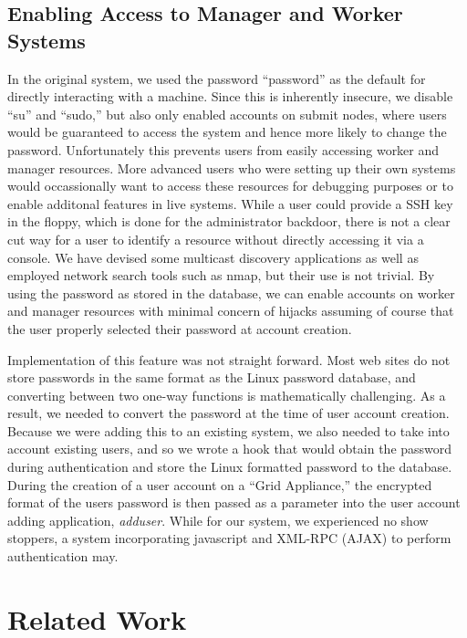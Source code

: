 \documentclass[twocolumn]{svjour3}
\begin{document}
\subsection{Enabling Access to Manager and Worker Systems}
 
In the original system, we used the password ``password'' as the default for
directly interacting with a machine.  Since this is inherently insecure, we
disable ``su'' and ``sudo,'' but also only enabled accounts on submit nodes,
where users would be guaranteed to access the system and hence more likely to
change the password.  Unfortunately this prevents users from easily accessing
worker and manager resources.  More advanced users who were setting up their
own systems would occassionally want to access these resources for debugging
purposes or to enable additonal features in live systems.  While a user could
provide a SSH key in the floppy, which is done for the administrator backdoor,
there is not a clear cut way for a user to identify a resource without directly
accessing it via a console.  We have devised some multicast discovery
applications as well as employed network search tools such as nmap, but their
use is not trivial.  By using the password as stored in the database, we can
enable accounts on worker and manager resources with minimal concern of hijacks
assuming of course that the user properly selected their password at account
creation.

Implementation of this feature was not straight forward.  Most web sites do not
store passwords in the same format as the Linux password database, and
converting between two one-way functions is mathematically challenging.  As a
result, we needed to convert the password at the time of user account creation.
Because we were adding this to an existing system, we also needed to take into
account existing users, and so we wrote a hook that would obtain the password
during authentication and store the Linux formatted password to the database.
During the creation of a user account on a ``Grid Appliance,'' the encrypted
format of the users password is then passed as a parameter into the user
account adding application, {\em adduser}.  While for our system, we
experienced no show stoppers, a system incorporating javascript and XML-RPC
(AJAX) to perform authentication may.

\section{Related Work}
\label{related_work}
\end{document}
